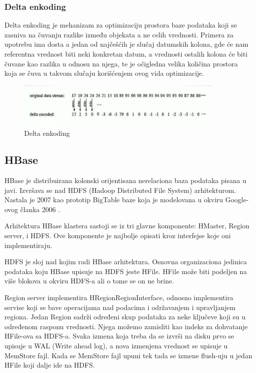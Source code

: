 \documentclass[12pt,oneside]{memoir}
\begin{document}
\subsubsection{Delta enkoding}
Delta enkoding je mehanizam za optimizaciju prostora baze podataka koji se zasniva na čuvanju razlike između objekata a ne celih vrednosti. Primera za upotrebu ima dosta a jedan od najčešćih je slučaj datumskih kolona, gde će nam referentna vrednost biti neki konkretan datum, a vrednosti ostalih kolona će biti čuvane kao razlika u odnosu na njega, te je očigledna velika količina prostora koja se čuva u takvom slučaju korišćenjem ovog vida optimizacije.

\begin{figure}[!ht]
  \centering
  \includegraphics[width=0.9\textwidth]{delta-encoding.png}
  \caption{Delta enkoding}
  \label{fig:grafikon}
\end{figure}

\subsection{HBase}

HBase je distribuirana kolonski orijentisana nerelaciona baza podataka  pisana u javi. Izvršava se nad HDFS (Hadoop Distributed File System) arhitekturom. Nastala je 2007 kao prototip BigTable baze koja je modelovana u okviru Google-ovog članka 2006 \cite{BigTable}. 

Arhitektura HBase klastera sastoji se iz tri glavne komponente: HMaster, Region server, i HDFS.  Ove komponente je najbolje opisati kroz interfejse koje oni implementiraju. 

HDFS je sloj nad kojim radi HBase arhitektura. Osnovna organizaciona jedinica podataka koju HBase upisuje na HDFS jeste HFile. HFile može biti podeljen na više blokova u okviru HDFS-a ali o tome se on ne brine. 

Region server implementira HRegionRegionInterface, odnosno implementira servise koji se bave operacijama nad podacima i održavanjem i upravljanjem regiona. Jedan Region sadrži određeni skup podataka za neke ključeve koji su u određenom rasponu vrednosti.  Njega možemo zamisliti kao indeks za dohvatanje HFile-ova sa HDFS-a.  Svaka izmena koja treba da se izvrši na disku prvo se upisuje u WAL (Write ahead log), a nova izmenjena vrednost se upisuje u MemStore fajl. Kada se MemStore fajl upuni tek tada se izmene flush-uju u jedan HFile koji dalje ide na HDFS. 
\end{document}
